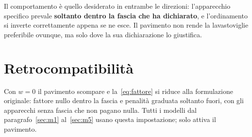 Il comportamento è quello desiderato in entrambe le direzioni: l'apparecchio specifico prevale
\textbf{soltanto dentro la fascia che ha dichiarato}, e l'ordinamento si inverte correttamente
appena se ne esce. Il pavimento non rende la lavastoviglie preferibile ovunque, ma solo dove la
sua dichiarazione lo giustifica.

\section{Retrocompatibilità}

Con $w = 0$ il pavimento scompare e la~\eqref{eq:fattore} si riduce alla formulazione originale:
fattore nullo dentro la fascia e penalità graduata soltanto fuori, con gli apparecchi senza fascia
che non pagano nulla. Tutti i modelli dal paragrafo~\ref{sec:m1} al~\ref{sec:m5} usano questa
impostazione; solo  attiva il pavimento.
